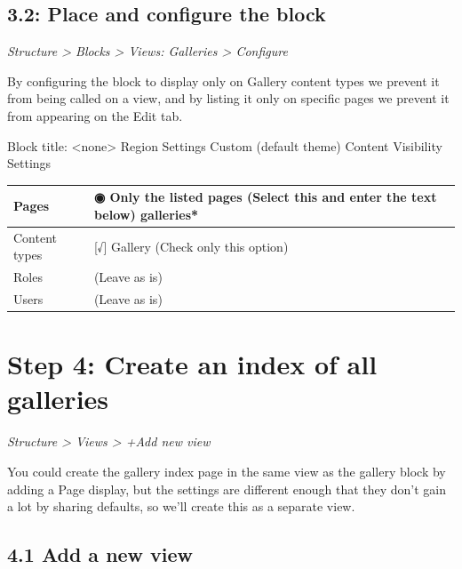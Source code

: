 \documentclass[letterpaper,10pt,english]{sphinxmanual}
\begin{document}
\subsection{3.2: Place and configure the block}
\label{recipe:place-and-configure-the-block}
\emph{Structure \textgreater{} Blocks \textgreater{} Views: Galleries \textgreater{} Configure}

By configuring the block to display only on Gallery content types we prevent it from being called on a view, and by listing it only on specific pages we prevent it from appearing on the Edit tab.

Block title:  \textless{}none\textgreater{}
Region Settings
Custom (default theme)
Content
Visibility Settings

\begin{tabulary}{\linewidth}{|L|L|}
\hline

Pages
 & 
◉ Only the listed pages (Select this and enter the text below)
galleries*
\\\hline

Content types
 & 
{[}√{]} Gallery (Check only this option)
\\\hline

Roles
 & 
(Leave as is)
\\\hline

Users
 & 
(Leave as is)
\\\hline
\end{tabulary}



\section{Step 4: Create an index of all galleries}
\label{recipe:step-4-create-an-index-of-all-galleries}
\emph{Structure \textgreater{} Views \textgreater{} +Add new view}

You could create the gallery index page in the same view as the gallery block by adding a Page display, but the settings are different enough that they don’t gain a lot by sharing defaults, so we’ll create this as a separate view.


\subsection{4.1 Add a new view}
\label{recipe:add-a-new-view}
\end{document}
